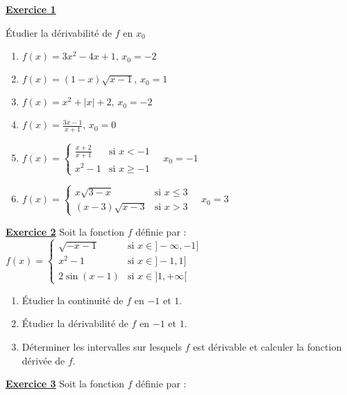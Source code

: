 \documentclass[12pt,a4paper]{article}
\begin{document}
\begin{multicols}{2}
\setlength{\columnseprule}{0.1mm} %
\textbf{\underline{Exercice 1}}

Étudier la dérivabilité de \( f \) en \( x_0 \)
\begin{enumerate}[align=left]
    \item \( \displaystyle f(x) = 3x^2 - 4x + 1, \, x_0 = -2 \)
    \item \( \displaystyle f(x) = (1 - x)\sqrt{x - 1}, \, x_0 = 1 \)
    \item \( \displaystyle f(x) = x^2 + |x| + 2, \, x_0 = -2 \)
    \item \( \displaystyle f(x) = \frac{3x - 1}{x + 1}, \, x_0 = 0 \)
    \item \( \displaystyle  f(x) = 
    \begin{cases}
        \frac{x + 2}{x + 1} & \text{si } x < -1 \\
        x^2 - 1 & \text{si } x \geq -1
    \end{cases}
    \quad x_0 = -1 \)
    
    \item \( \displaystyle f(x) = 
    \begin{cases}
        x\sqrt{3 - x} & \text{si } x \leq 3 \\
        (x - 3)\sqrt{x - 3} & \text{si } x > 3
    \end{cases}
    \quad x_0 = 3 \)
\end{enumerate}
\textbf{\underline{Exercice 2}} Soit la fonction \( f \) définie par :\\
\(f(x) = 
\begin{cases}
    \sqrt{-x - 1} & \text{si } x \in ]-\infty, -1] \\
    x^2 - 1 & \text{si } x \in ]-1, 1] \\
    2\sin(x - 1) & \text{si } x \in ]1, +\infty[
\end{cases}\)

\begin{enumerate}
    \item Étudier la continuité de \( f \) en \( -1 \) et \( 1 \).
    \item Étudier la dérivabilité de \( f \) en \( -1 \) et \( 1 \).
    \item Déterminer les intervalles sur lesquels \( f \) est dérivable et calculer la fonction dérivée de \( f \).
\end{enumerate}
\textbf{\underline{Exercice 3}} Soit la fonction \( f \) définie par :


\end{multicols}
\end{document}
